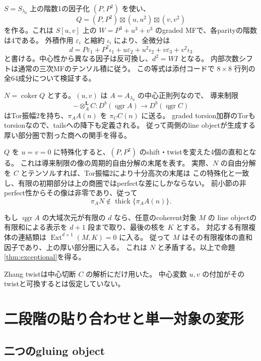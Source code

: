 \documentclass[a4paper,11pt]{ltjsarticle}
\theoremstyle{definition}
\newcommand{\Ext}{\operatorname{Ext}}
\newcommand{\qgr}{\operatorname{qgr}}
\begin{document}
$S=S_{\lambda_0}$ 上の階数1の因子化 $(P,P^2)$ を使い、
\[
 Q=(P,P^2)\boxtimes(u,u^2)\boxtimes(v,v^2)
\]
を作る。これは $S[u,v]$ 上の $W=P^3+u^3+v^3$ のgraded MFで、各parityの階数は4である。
外積作用 $\varepsilon_i$ と縮約 $\iota_i$ により、全微分は
\[
 d=P\varepsilon_1+P^2\iota_1+
 u\varepsilon_2+u^2\iota_2+v\varepsilon_3+v^2\iota_3
\]
と書ける。中心性から異なる因子は反可換し、$d^2=W I$ となる。
内部次数シフトは通常の三次MFのテンソル積に従う。
この等式は添付コードで $8\times8$ 行列の全64成分について検証する。

$N=\operatorname{coker}Q$ とする。$(u,v)$ は $A=A_{\lambda_0}$ の中心正則列なので、
導来制限
\[
 -\otimes_A^{\mathbf L}C:D^b(\qgr A)\to D^b(\qgr C)
\]
はTor振幅2を持ち、$\pi_AA(n)$ を $\pi_CC(n)$ に送る。
graded torsion加群のTorもtorsionなので、tailsへの降下も定義される。
従って両側のline objectが生成する厚い部分圏で割った商への関手を得る。

$Q$ を $u=v=0$ に特殊化すると、$(P,P^2)$ のshift・twistを変えた4個の直和となる。
これは導来制限の像の周期的自由分解の末尾を表す。
実際、$N$ の自由分解を $C$ とテンソルすれば、Tor振幅2により十分高次の末尾は
この特殊化と一致し、有限の初期部分は上の商圏ではperfectな差にしかならない。
前小節の非perfect性からその像は非零であり、従って
\[
 \pi_A N\notin\operatorname{thick}\{\pi_AA(n)\}.
\]

もし $\qgr A$ の大域次元が有限の $d$ なら、任意のcoherent対象 $M$ の
line objectの有限和による表示を $d+1$ 段まで取り、最後の核を $K$ とする。
対応する有限複体の連結類は $\Ext^{d+1}(M,K)=0$ に入る。
従って $M$ はその有限複体の直和因子であり、上の厚い部分圏に入る。
これは $N$ と矛盾する。以上で命題\ref{thm:exceptional}を得る。

Zhang twistは中心切断 $C$ の解析にだけ用いた。
中心変数 $u,v$ の付加がそのtwistと可換するとは仮定していない。

\section{二段階の貼り合わせと単一対象の変形}\label{sec:gluing-objects}

\subsection{二つのgluing object}
\end{document}
